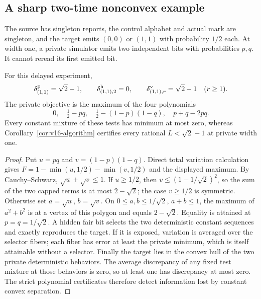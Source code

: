 \subsection{A sharp two-time nonconvex example}
The source has singleton reports, the control alphabet and actual mark
are singleton, and the target emits $(0,0)$ or $(1,1)$ with probability
$1/2$ each. At width one, a private simulator emits two independent bits
with probabilities $p,q$. It cannot reread its first emitted bit.

\begin{proposition}
\label{prop:v16-gap}
For this delayed experiment,
\[
 \delta^{\rm p}_{(1,1)}=\sqrt2-1,\qquad
 \delta^{\rm h}_{(1,1),2}=0,\qquad \delta^{\rm v}_{(1,1),r}=\sqrt2-1\quad(r\ge1).
\]
The private objective is the maximum of the four polynomials
\[
 0,\quad \tfrac12-pq,\quad
 \tfrac12-(1-p)(1-q),\quad p+q-2pq.
\]
Every constant mixture of these tests has minimum at most zero,
whereas Corollary~\ref{cor:v16-algorithm} certifies every rational
$L<\sqrt2-1$ at private width one.
\end{proposition}
\begin{proof}
Put $u=pq$ and $v=(1-p)(1-q)$. Direct total variation calculation gives
$F=1-\min(u,1/2)-\min(v,1/2)$ and the displayed maximum. By
Cauchy--Schwarz, $\sqrt u+\sqrt v\le1$. If $u\ge1/2$, then
$v\le(1-1/\sqrt2)^2$, so the sum of the two capped terms is at most
$2-\sqrt2$; the case $v\ge1/2$ is symmetric. Otherwise set
$a=\sqrt u$, $b=\sqrt v$. On
$0\le a,b\le1/\sqrt2$, $a+b\le1$, the maximum of $a^2+b^2$
is at a vertex of this polygon and equals $2-\sqrt2$.
Equality is attained at $p=q=1/\sqrt2$. A hidden fair bit selects the
two deterministic constant sequences and exactly reproduces the target.
If it is exposed, variation is averaged over the selector fibers;
each fiber has error at least the private minimum, which is itself
attainable without a selector. Finally the target lies in the convex
hull of the two private deterministic behaviors. The average discrepancy
of any fixed test mixture at those behaviors is zero, so at least one
has discrepancy at most zero. The strict polynomial certificates
therefore detect information lost by constant convex separation.
\end{proof}
